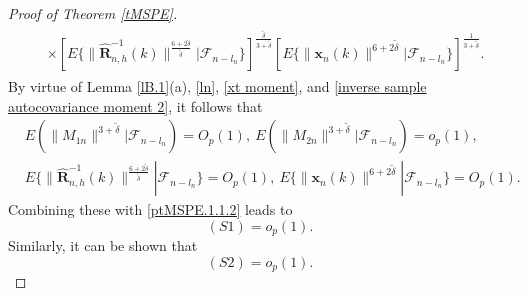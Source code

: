 \documentclass[ejsv2]{imsart}
\theoremstyle{plain}
\theoremstyle{definition}
\theoremstyle{remark}
\begin{document}
\begin{proof}[Proof of Theorem \ref{tMSPE}]
{\begin{align}
\begin{split}
    &\times [E\{\lVert\hat{\mathbf{R}}_{n,h}^{-1}(k)\rVert^{\frac{6+2\tilde{\delta}}{\tilde{\delta}}}|\mathcal{F}_{n-l_n}\}]^{\frac{\tilde{\delta}}{3+\tilde{\delta}}}
    [E\{\lVert\mathbf{x}_n(k)\rVert^{6+2\tilde{\delta}}|\mathcal{F}_{n-l_n}\}]^{\frac{1}{3+\tilde{\delta}}}.
\end{split}
\end{align}
By virtue of Lemma \ref{lB.1}(a), \eqref{ln}, \eqref{xt moment}, and \eqref{inverse sample autocovariance moment 2}, it follows that
\begin{equation*}
\begin{split}
     & E(\lVert M_{1n}\rVert^{3+\tilde{\delta}}|\mathcal{F}_{n-l_n})=O_p(1),\ E(\lVert M_{2n}\rVert^{3+\tilde{\delta}}|\mathcal{F}_{n-l_n})=o_p(1),\\
     & E\{\lVert\hat{\mathbf{R}}_{n,h}^{-1}(k)\rVert^{\frac{6+2\tilde{\delta}}{\tilde{\delta}}}|\mathcal{F}_{n-l_n}\}=O_p(1),\ E\{\lVert\mathbf{x}_n(k)\rVert^{6+2\tilde{\delta}}|\mathcal{F}_{n-l_n}\}=O_p(1).
\end{split}
\end{equation*}
Combining these with \eqref{ptMSPE.1.1.2} leads to
\begin{equation}\label{ptMSPE.1.1.3}
(S1)=o_p(1).
\end{equation}
Similarly, it can be shown that
\begin{equation}\label{ptMSPE.1.1.4}
(S2)=o_p(1).
\end{equation}

}
\end{proof}
\end{document}
